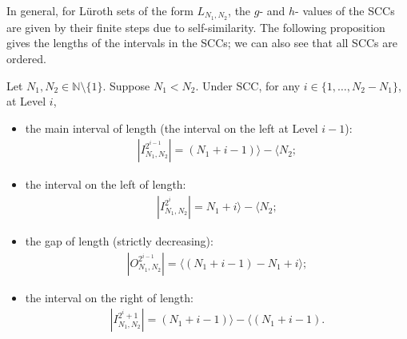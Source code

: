 \documentclass{ws-ijnt}
\begin{document}
	In general, for L\"uroth sets of the form $L_{N_1,N_2}$, the $g$- and $h$- values of the SCCs are given by their finite steps due to self-similarity. The following proposition gives the lengths of the intervals in the SCCs; we can also see that all SCCs are ordered.
	\begin{proposition}\label{prop: Stepwise Complete g h}
		Let $N_1,N_2\in\mathbb{N}\setminus\{1\}$. Suppose $N_1<N_2$. Under SCC, for any $i\in\{1,\ldots,N_2-N_1\}$, at Level $i$,
		\begin{itemize}
			\item the main interval of length (the interval on the left at Level $i-1$):
			\begin{align*}
				\left\lvert I_{N_1,N_2}^{2^{i-1}}\right\rvert
				=(N_1+i-1)\rangle-\langle N_2;
			\end{align*}
			\item the interval on the left of length:
			\begin{align*}
				\left\lvert I_{N_1,N_2}^{2^i}\right\rvert
				=N_1+i\rangle-\langle N_2;
			\end{align*}
			\item the gap of length (strictly decreasing):
			\begin{align}
				\label{eq: SCC gap length}
				\left\lvert O_{N_1,N_2}^{2^{i-1}}\right\rvert
				=\langle (N_1+i-1)-N_1+i\rangle;
			\end{align}
			\item the interval on the right of length:
			\begin{align*}
				\left\lvert I_{N_1,N_2}^{2^i+1}\right\rvert
				=(N_1+i-1)\rangle-\langle(N_1+i-1).
			\end{align*}
		\end{itemize}
	\end{proposition}
	
\end{document}
